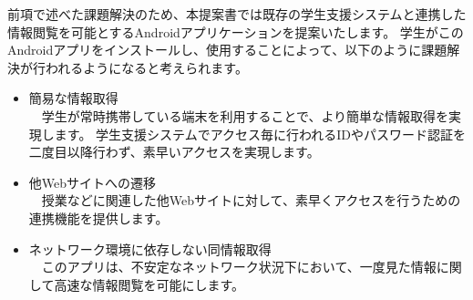 前項で述べた課題解決のため、本提案書では既存の学生支援システムと連携した情報閲覧を可能とするAndroidアプリケーションを提案いたします。
学生がこのAndroidアプリをインストールし、使用することによって、以下のように課題解決が行われるようになると考えられます。
\begin{itemize}
\item 簡易な情報取得\\
　学生が常時携帯している端末を利用することで、より簡単な情報取得を実現します。
学生支援システムでアクセス毎に行われるIDやパスワード認証を二度目以降行わず、素早いアクセスを実現します。
\item 他Webサイトへの遷移\\
　授業などに関連した他Webサイトに対して、素早くアクセスを行うための連携機能を提供します。
\item ネットワーク環境に依存しない同情報取得\\
　このアプリは、不安定なネットワーク状況下において、一度見た情報に関して高速な情報閲覧を可能にします。
\end{itemize}　
